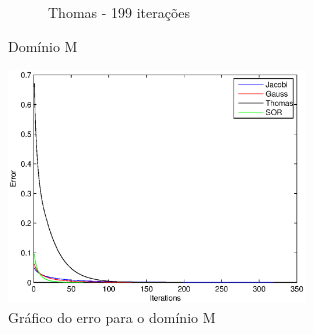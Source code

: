 \documentclass{article}
\begin{document}
\begin{figure}
\begin{subfigure}[b]{0.45\textwidth}
				\caption{Thomas - 199 iterações}
			\end{subfigure}
			\caption{Domínio M}
			\label{fig:m}
			\centering
			\includegraphics[width=0.7\textwidth]{figures/m-error.eps}
			\caption{Gráfico do erro para o domínio M}
			\label{fig:m:erro}
		\end{figure}
\end{document}
